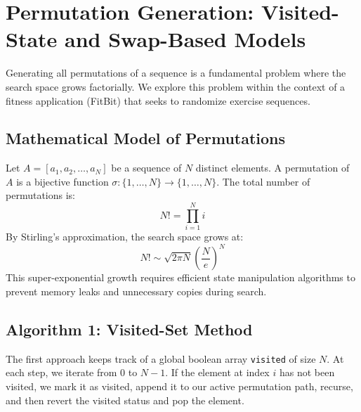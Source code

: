 \documentclass[10pt,journal,compsoc,onecolumn]{IEEEtran}
\begin{document}
\section{Permutation Generation: Visited-State and Swap-Based Models}
\label{sec:permutations}

Generating all permutations of a sequence is a fundamental problem where the search space grows factorially. We explore this problem within the context of a fitness application (FitBit) that seeks to randomize exercise sequences.

\subsection{Mathematical Model of Permutations}
Let $A = [a_1, a_2, \ldots, a_N]$ be a sequence of $N$ distinct elements. A permutation of $A$ is a bijective function $\sigma: \{1, \ldots, N\} \to \{1, \ldots, N\}$. The total number of permutations is:
\begin{equation}
N! = \prod_{i=1}^{N} i
\end{equation}
By Stirling's approximation, the search space grows at:
\begin{equation}
N! \sim \sqrt{2\pi N} \left( \frac{N}{e} \right)^N
\end{equation}
This super-exponential growth requires efficient state manipulation algorithms to prevent memory leaks and unnecessary copies during search.

\subsection{Algorithm 1: Visited-Set Method}
The first approach keeps track of a global boolean array \texttt{visited} of size $N$. At each step, we iterate from $0$ to $N-1$. If the element at index $i$ has not been visited, we mark it as visited, append it to our active permutation path, recurse, and then revert the visited status and pop the element.
\end{document}

